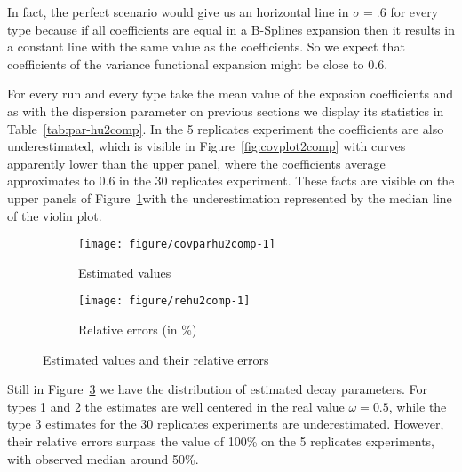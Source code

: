In fact, the perfect scenario would give us an horizontal line in $\sigma=.6$ for every type because if all coefficients are equal in a B-Splines expansion then it results in a constant line with the same value as the coefficients. So we expect that coefficients of the variance functional expansion might be close to 0.6. 

For every run and every type take the mean value of the expasion coefficients and as with the dispersion parameter on previous sections we display its statistics in Table~\ref{tab:par-hu2comp}. In the 5 replicates experiment the coefficients are also underestimated, which is visible in Figure~\ref{fig:covplot2comp} with curves apparently lower than the upper panel, where the coefficients average approximates to 0.6 in the 30 replicates experiment. These facts are visible on the upper panels of Figure~\ref{fig:cpest-hu2comp}with the underestimation represented by the median line of the violin plot.


\begin{figure}[t]
  \begin{subfigure}{\textwidth}
  \centering
\begin{knitrout}
\color{fgcolor}
\texttt{[image: figure/covparhu2comp-1]} 

\end{knitrout}
    \caption{Estimated values} \label{fig:cpest-hu2comp}
  \end{subfigure}
  \begin{subfigure}{\textwidth}
  \centering
\begin{knitrout}
\color{fgcolor}
\texttt{[image: figure/rehu2comp-1]} 

\end{knitrout}
    \caption{Relative errors (in \%) }\label{fig:re-hu2comp}
  \end{subfigure}
  \caption{Estimated values and their relative errors}
  \label{fig:cp-hu2comp}
\end{figure}  

Still in Figure~\ref{fig:cp-hu2comp} we have the distribution of estimated decay parameters. For types 1 and 2 the estimates are well centered in the real value $\omega=0.5$, while the type 3 estimates for the 30 replicates experiments are underestimated. However, their relative errors surpass the value of 100\% on the 5 replicates experiments, with observed median around 50\%. 

